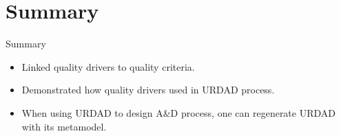 \section{Summary}

\begin{frame}{Summary}
 \begin{itemize}
  \item<alert@+> Linked quality drivers to quality criteria.
  \item<alert@+> Demonstrated how quality drivers used in URDAD process.
  \item<alert@+> When using URDAD to design A\&D process, one can regenerate URDAD with its metamodel.
 \end{itemize}
\end{frame}
